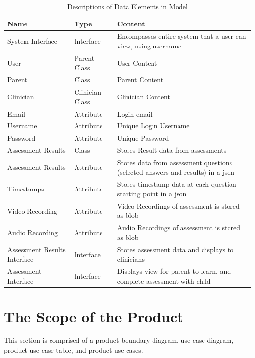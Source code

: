 \documentclass[12pt]{article}
\begin{document}
\begin{table}[h!]
  \caption{Descriptions of Data Elements in Model}
  \label{tab:data_dictionary}
\begin{tabularx}{\textwidth}{p{2.5cm}p{3cm}X}
  \toprule {\textbf{Name}} & {\textbf{Type}} & {\textbf{Content}}\\
  \midrule
  System Interface & Interface & Encompasses entire system that a user can view, using username \\ 
  \hline
  User & Parent Class & User Content \\ 
  \hline 
  Parent & Class & Parent Content \\ 
  \hline
  Clinician & Clinician Class & Clinician Content \\ 
  \hline 
  Email & Attribute & Login email \\
  \hline 
  Username & Attribute & Unique Login Username \\
  \hline 
  Password & Attribute & Unique Password \\
  \hline 
  Assessment Results & Class & Stores Result data from assessments \\
  \hline 
  Assessment Results & Attribute & Stores data from assessment questions (selected answers and results) in a json \\
  \hline 
  Timestamps & Attribute & Stores timestamp data at each question starting point in a json \\
  \hline 
  Video Recording & Attribute & Video Recordings of assessment is stored as blob \\
  \hline 
  Audio Recording & Attribute & Audio Recordings of assessment is stored as blob \\
  \hline 
  Assessment Results Interface & Interface & Stores assessment data and displays to clinicians \\ 
  \hline 
  Assessment Interface & Interface & Displays view for parent to learn, and complete assessment with child \\
  \bottomrule
  \end{tabularx}
\end{table}

\newpage

\section{The Scope of the Product}
\hspace{2em}This section is comprised of a product boundary diagram, use case diagram, product use case table, and product use cases.
\end{document}
